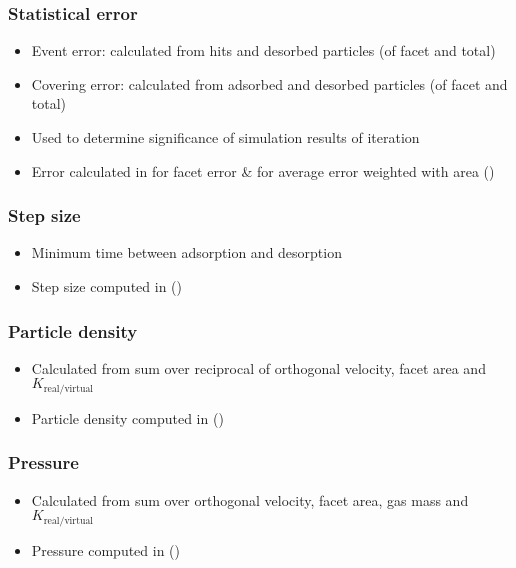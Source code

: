 \subsubsection{Statistical error}
\begin{itemize}[noitemsep,topsep=0pt, partopsep=0pt]
\item Event error: calculated from hits and desorbed particles (of facet and total)
\item Covering error: calculated from adsorbed and desorbed particles (of facet and total)
\item Used to determine significance of simulation results of iteration
\item Error calculated in  for facet error \&  for average error weighted with area ()
\end{itemize}

\subsubsection{Step size}
\begin{itemize}[noitemsep,topsep=0pt, partopsep=0pt]
\item Minimum time between adsorption and desorption
\item Step size computed in  ()
\end{itemize}

\subsubsection{Particle density}
\begin{itemize}[noitemsep,topsep=0pt, partopsep=0pt]
\item Calculated from sum over reciprocal of orthogonal velocity, facet area and $K_{\text{real}/\text{virtual}}$
\item Particle density computed in  ()
\end{itemize}

\subsubsection{Pressure}
\begin{itemize}[noitemsep,topsep=0pt, partopsep=0pt]
\item Calculated from sum over orthogonal velocity, facet area, gas mass and $K_{\text{real}/\text{virtual}}$
\item Pressure computed in  ()
\end{itemize}

